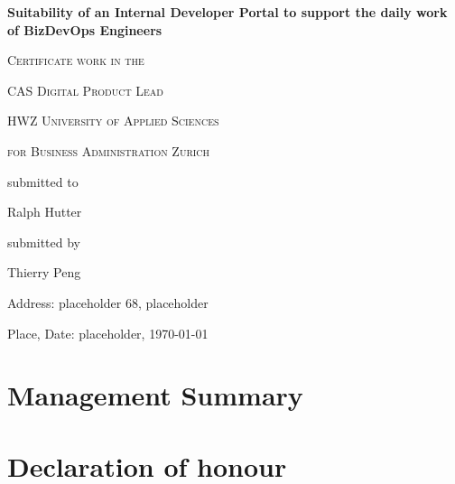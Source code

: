 \documentclass[a4paper,12pt]{article}
\begin{document}
    \begin{titlepage}
        \begin{center}
        {\huge\bfseries Suitability of an Internal Developer Portal to support the daily work of BizDevOps Engineers\par}
            \vspace{2cm}

            {\scshape\large Certificate work in the \par}
            {\scshape\large CAS Digital Product Lead \par}
            \vspace{1cm}

            {\scshape\large HWZ University of Applied Sciences \par}
            {\scshape\large for Business Administration Zurich \par}
            \vspace{4cm}

            {\normalsize submitted to\par}
            \vspace{0.5cm}

            {\large Ralph Hutter\par}
            \vfill
            {\normalsize submitted by\par}
            \vspace{0.5cm}
            {\large Thierry Peng\par}
            \vspace{0.5cm}
            {\normalsize Address: placeholder 68, placeholder\par}
            {\normalsize  Place, Date: placeholder, \today\par}

        \end{center}
    \end{titlepage}


    \section*{Management Summary}
    \pagebreak


    \tableofcontents
    \pagebreak


    \section*{Declaration of honour}
\end{document}

